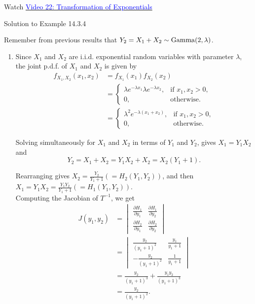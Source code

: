 \documentclass[
]{book}
\providecommand{\tightlist}{%
  \setlength{\itemsep}{0pt}\setlength{\parskip}{0pt}}
\begin{document}
Watch \href{https://mediaspace.nottingham.ac.uk/media/Transformation+FINAL+VERSION/1_33aakq3q}{\textcolor{blue}{Video 22: Transformation of Exponentials}}

Solution to Example 14.3.4

Remember from previous results that \(Y_2 = X_1 + X_2 \sim {\rm Gamma} (2,\lambda)\).

\begin{enumerate}
\def\labelenumi{(\alph{enumi})}
\tightlist
\item
  Since \(X_1\) and \(X_2\) are i.i.d. exponential random variables with parameter \(\lambda\), the joint p.d.f. of \(X_1\) and \(X_2\) is given by\\

  \begin{align*}
  f_{X_1,X_2}(x_1,x_2) &= f_{X_1}(x_1)f_{X_2}(x_2) \\[3pt]
  &= \begin{cases} \lambda e^{-\lambda x_1} \lambda e^{-\lambda x_2}, & \text{if } x_1,x_2 > 0, \\ 0, & \text{otherwise.} \end{cases} \\[3pt]
  &= \begin{cases} \lambda^2 e^{-\lambda(x_1+x_2)}, & \text{if } x_1,x_2 > 0, \\ 0, & \text{otherwise.} \end{cases}
  \end{align*}

  Solving simultaneously for \(X_1\) and \(X_2\) in terms of \(Y_1\) and \(Y_2\), gives \(X_1=Y_1X_2\) and\\

  \[Y_2 = X_1+X_2 = Y_1X_2 + X_2 = X_2(Y_1+1).\]

  Rearranging gives \(X_2 = \frac{Y_2}{Y_1+1} (=H_2 (Y_1,Y_2))\), and then \(X_1 = Y_1X_2 = \frac{Y_1Y_2}{Y_1+1} (=H_1 (Y_1,Y_2))\).\\
  Computing the Jacobian of \(T^{-1}\), we get\\

  \begin{align*}
  J(y_1,y_2) &= \begin{vmatrix} \frac{\partial H_1}{\partial y_1} & \frac{\partial H_1}{\partial y_2} \\ \frac{\partial H_2}{\partial y_1} & \frac{\partial H_2}{\partial y_2} \end{vmatrix} \\[3pt]
  &= \begin{vmatrix} \frac{y_2}{(y_1+1)^2} & \frac{y_1}{y_1+1} \\ -\frac{y_2}{(y_1+1)^2} & \frac{1}{y_1+1} \end{vmatrix} \\[3pt]
  &= \frac{y_2}{(y_1+1)^3} + \frac{y_1y_2}{(y_1+1)^3} \\[3pt]
  &= \frac{y_2}{(y_1+1)^2}.
  \end{align*}
\end{enumerate}
\end{document}
